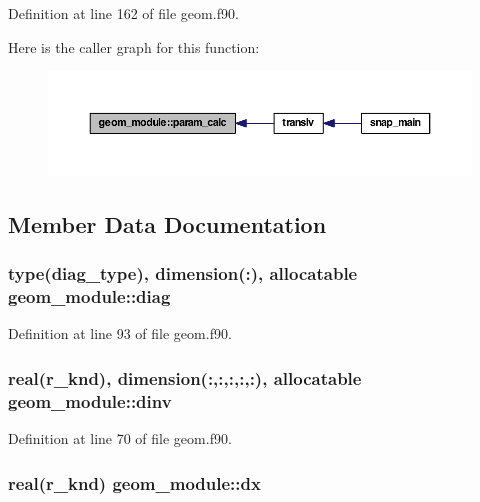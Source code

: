 Definition at line 162 of file geom.\-f90.



Here is the caller graph for this function\-:\nopagebreak
\begin{figure}[H]
\begin{center}
\leavevmode
\includegraphics[width=350pt]{classgeom__module_aa09319572e809c686211758ef5fb129e_icgraph}
\end{center}
\end{figure}




\subsection{Member Data Documentation}
\hypertarget{classgeom__module_a5e8f7c5c9e3886c2d92abd9d5e8f4e20}{
\subsubsection[{diag}]{\setlength{\rightskip}{0pt plus 5cm}type({\bf diag\-\_\-type}), dimension(\-:), allocatable geom\-\_\-module\-::diag}}\label{classgeom__module_a5e8f7c5c9e3886c2d92abd9d5e8f4e20}


Definition at line 93 of file geom.\-f90.

\hypertarget{classgeom__module_ae4c351982371a6870429ab660ec35e45}{
\subsubsection[{dinv}]{\setlength{\rightskip}{0pt plus 5cm}real(r\-\_\-knd), dimension(\-:,\-:,\-:,\-:,\-:), allocatable geom\-\_\-module\-::dinv}}\label{classgeom__module_ae4c351982371a6870429ab660ec35e45}


Definition at line 70 of file geom.\-f90.

\hypertarget{classgeom__module_a2f292c19b0e9bfc4cde1d54f0e9d4472}{
\subsubsection[{dx}]{\setlength{\rightskip}{0pt plus 5cm}real(r\-\_\-knd) geom\-\_\-module\-::dx}}\label{classgeom__module_a2f292c19b0e9bfc4cde1d54f0e9d4472}


